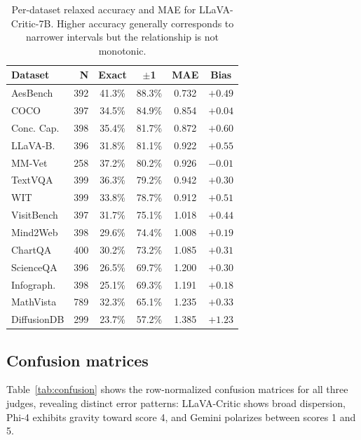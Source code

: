 \documentclass{article}
\begin{document}
\begin{table}[t]
\centering
\caption{Per-dataset relaxed accuracy and MAE for LLaVA-Critic-7B. Higher accuracy generally corresponds to narrower intervals but the relationship is not monotonic.}
\label{tab:relaxed_accuracy}
\small
\begin{tabular}{lrcccc}
\toprule
\textbf{Dataset} & \textbf{N} & \textbf{Exact} & $\pm$\textbf{1} & \textbf{MAE} & \textbf{Bias} \\
\midrule
AesBench & 392 & 41.3\% & 88.3\% & 0.732 & $+0.49$ \\
COCO & 397 & 34.5\% & 84.9\% & 0.854 & $+0.04$ \\
Conc. Cap. & 398 & 35.4\% & 81.7\% & 0.872 & $+0.60$ \\
LLaVA-B. & 396 & 31.8\% & 81.1\% & 0.922 & $+0.55$ \\
MM-Vet & 258 & 37.2\% & 80.2\% & 0.926 & $-0.01$ \\
TextVQA & 399 & 36.3\% & 79.2\% & 0.942 & $+0.30$ \\
WIT & 399 & 33.8\% & 78.7\% & 0.912 & $+0.51$ \\
VisitBench & 397 & 31.7\% & 75.1\% & 1.018 & $+0.44$ \\
Mind2Web & 398 & 29.6\% & 74.4\% & 1.008 & $+0.19$ \\
ChartQA & 400 & 30.2\% & 73.2\% & 1.085 & $+0.31$ \\
ScienceQA & 396 & 26.5\% & 69.7\% & 1.200 & $+0.30$ \\
Infograph. & 398 & 25.1\% & 69.3\% & 1.191 & $+0.18$ \\
MathVista & 789 & 32.3\% & 65.1\% & 1.235 & $+0.33$ \\
DiffusionDB & 299 & 23.7\% & 57.2\% & 1.385 & $+1.23$ \\
\bottomrule
\end{tabular}
\end{table}

\subsection{Confusion matrices}

Table~\ref{tab:confusion} shows the row-normalized confusion matrices for all three judges, revealing distinct error patterns: LLaVA-Critic shows broad dispersion, Phi-4 exhibits gravity toward score 4, and Gemini polarizes between scores 1 and 5.
\end{document}
